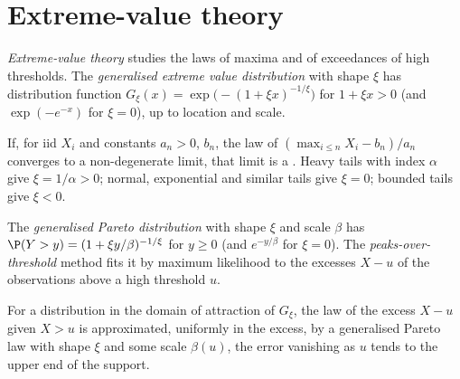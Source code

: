 \section{Extreme-value theory}

\begin{definition}\label{def:qm:robust-statistics-and-heavy-tails:gev}
\emph{Extreme-value theory} studies the laws of maxima and of exceedances of high thresholds. The
\emph{generalised extreme value distribution} with shape $\xi$ has distribution function
$G_\xi(x) = \exp\bigl(-(1 + \xi x)^{-1/\xi}\bigr)$ for $1 + \xi x > 0$ (and $\exp(-e^{-x})$ for $\xi = 0$), up to location and scale.
\end{definition}

\begin{theorem}\label{thm:qm:robust-statistics-and-heavy-tails:ftg}
If, for iid $X_i$ and constants $a_n > 0$, $b_n$, the law of $(\max_{i \le n}X_i - b_n)/a_n$ converges to a non-degenerate limit, that limit is a
. Heavy tails with index $\alpha$ give $\xi = 1/\alpha > 0$; normal, exponential and similar tails
give $\xi = 0$; bounded tails give $\xi < 0$.
\end{theorem}

\begin{definition}\label{def:qm:robust-statistics-and-heavy-tails:gpd}
The \emph{generalised Pareto distribution} with shape $\xi$ and scale $\beta$ has $\P(Y > y) = (1 +
\xi y/\beta)^{-1/\xi}$ for $y \ge 0$ (and $e^{-y/\beta}$ for $\xi = 0$). The \emph{peaks-over-threshold} method fits
it by maximum likelihood to the excesses $X - u$ of the observations above a high threshold $u$.
\end{definition}

\begin{theorem}\label{thm:qm:robust-statistics-and-heavy-tails:pbdh}
For a distribution in the domain of attraction of $G_\xi$, the law of the excess $X - u$ given $X > u$ is approximated, uniformly in
the excess, by a generalised Pareto law with shape $\xi$ and some scale $\beta(u)$, the error vanishing as $u$ tends to the upper end
of the support.
\end{theorem}

